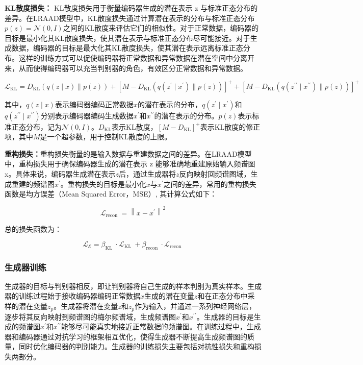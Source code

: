 \documentclass{article}
\begin{document}
\textbf{KL散度损失：} KL散度损失用于衡量编码器生成的潜在表示 z 与标准正态分布的差异。在LRAAD模型中，KL散度损失通过计算潜在表示的分布与标准正态分布$p(z)=\mathcal{N}(0, I)$之间的KL散度来评估它们的相似性。对于正常数据，编码器的目标是最小化其KL散度损失，使其潜在表示与标准正态分布尽可能接近。对于生成数据，编码器的目标是最大化其KL散度损失，使其潜在表示远离标准正态分布。这样的训练方式可以促使编码器将正常数据和异常数据在潜在空间中分离开来，从而使得编码器可以充当判别器的角色，有效区分正常数据和异常数据。

\begin{equation}
  \mathcal{L}_{\mathrm{KL}}=D_{\mathrm{KL}}(q(z \mid x) \| p(z)) + [M - D_{\mathrm{KL}}\left(q\left(z^{\prime} \mid x^{\prime}\right) \| p(z)\right)]^{+} + [M - D_{\mathrm{KL}}\left(q\left(z^{\prime \prime} \mid x^{\prime \prime}\right) \| p(z)\right)]^{+}
\end{equation}

其中，$q(z \mid x)$表示编码器编码正常数据$x$的潜在表示的分布，$q(z^\prime \mid x^\prime)$和$q(z^{\prime\prime} \mid x^{\prime\prime})$分别表示编码器编码生成数据$x^\prime$和$x^{\prime\prime}$的潜在表示的分布。$p(z)$表示标准正态分布，记为$\mathcal{N}(0, I)$。$D_{\mathrm{KL}}$表示KL散度，$[M - D_{\mathrm{KL}}]^{+}$表示KL散度的修正项，其中$M$是一个超参数，用于控制KL散度的上限。

\textbf{重构损失：}重构损失衡量的是输入数据与重建数据之间的差异。在LRAAD模型中，重构损失用于确保编码器生成的潜在表示 z 能够准确地重建原始输入频谱图 x。具体来说，编码器生成潜在表示$z$后，通过生成器将$z$反向映射回频谱图域，生成重建的频谱图$x^\prime$。重构损失的目标是最小化$x$与$x^\prime$之间的差异，常用的重构损失函数是均方误差（Mean Squared Error，MSE）, 其计算公式如下：

\begin{equation}
\mathcal{L}_{\text {recon }}=\left\|x-x^{\prime}\right\|^2
\end{equation}

总的损失函数为：

\begin{equation} \label{eq:encoder_loss}
  \mathcal{L_E}=\beta_{\text {KL }} \cdot\mathcal{L}_{\text {KL }}+\beta_{\text {recon }} \cdot\mathcal{L}_{\text {recon }}
\end{equation}

\subsubsection{生成器训练}
生成器的目标与判别器相反，即让判别器将自己生成的样本判别为真实样本。生成器的训练过程始于接收编码器编码正常数据$x$生成的潜在变量$z$和在正态分布中采样的潜在变量$z_{p}$。生成器将潜在变量$z$和$z_{p}$作为输入，并通过一系列神经网络层，逐步将其反向映射到频谱图的梅尔频谱域，生成频谱图$x^\prime$和$x^{\prime \prime}$。生成器的目标是生成的频谱图$x^\prime$和$x^{\prime \prime}$能够尽可能真实地接近正常数据的频谱图。在训练过程中，生成器和编码器通过对抗学习的框架相互优化，使得生成器不断提高生成频谱图的质量，同时优化编码器的判别能力。生成器的训练损失主要包括对抗性损失和重构损失两部分。
\end{document}
